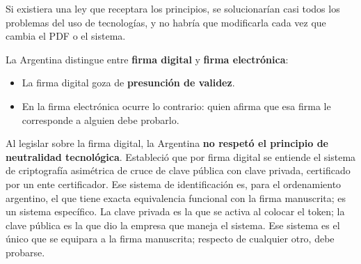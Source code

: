 \documentclass[12pt,oneside]{book}
\begin{document}
Si existiera una ley que receptara los principios, se solucionarían casi todos los problemas del uso de tecnologías, y no habría que modificarla cada vez que cambia el PDF o el sistema.

La Argentina distingue entre \textbf{firma digital} y \textbf{firma electrónica}:

\begin{itemize}
    \item La firma digital goza de \textbf{presunción de validez}.
    \item En la firma electrónica ocurre lo contrario: quien afirma que esa firma le corresponde a alguien debe probarlo.
\end{itemize}

Al legislar sobre la firma digital, la Argentina \textbf{no respetó el principio de neutralidad tecnológica}. Estableció que por firma digital se entiende el sistema de criptografía asimétrica de cruce de clave pública con clave privada, certificado por un ente certificador. Ese sistema de identificación es, para el ordenamiento argentino, el que tiene exacta equivalencia funcional con la firma manuscrita; es un sistema específico. La clave privada es la que se activa al colocar el token; la clave pública es la que dio la empresa que maneja el sistema. Ese sistema es el único que se equipara a la firma manuscrita; respecto de cualquier otro, debe probarse.
\end{document}

